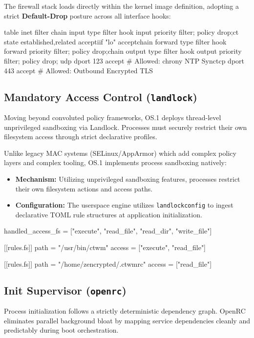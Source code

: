 \documentclass{article}
\let\originalfootnotesize\footnotesize
\let\oldverbatim\verbatim
\let\oldendverbatim\endverbatim
\renewenvironment{verbatim}{\originalfootnotesize\oldverbatim}{\oldendverbatim}
\begin{document}
The firewall stack loads directly within the kernel image definition, adopting a strict \textbf{Default-Drop} posture across all interface hooks:

\begin{verbatim}
[frame=single, label=nftables Core Configurations, breaklines=true, fontsize=\small]
table inet filter {chain input {type filter hook input priority filter;
policy drop;ct state established,related acceptiif "lo" accept}chain forward {type filter hook forward
priority filter; policy drop;}chain output {type filter hook output priority filter; policy drop;
udp dport 123 accept # Allowed: chrony NTP Synctcp dport 443 accept # Allowed: Outbound Encrypted TLS}}
\end{verbatim}

\newpage
\subsection{Mandatory Access Control (\texttt{landlock})}
Moving beyond convoluted policy frameworks, OS.1 deploys thread-level unprivileged sandboxing via Landlock. Processes must securely restrict their own filesystem access through strict declarative profiles.

Unlike legacy MAC systems (SELinux/AppArmor) which add complex policy layers and complex tooling, OS.1 implements process sandboxing natively:
\begin{itemize}
    \item \textbf{Mechanism:} Utilizing unprivileged sandboxing features, processes restrict their own filesystem actions and access paths.
    \item \textbf{Configuration:} The userspace engine utilizes \texttt{landlockconfig} to ingest declarative TOML rule structures at application initialization.
\end{itemize}

\begin{verbatim}
[frame=single, label=Example System Profile: /etc/landlock/ctwm.toml, breaklines=true, fontsize=\small]
[sandbox]
handled_access_fs = ["execute", "read_file", "read_dir", "write_file"]

[[rules.fs]]
path = "/usr/bin/ctwm"
access = ["execute", "read_file"]

[[rules.fs]]
path = "/home/zencrypted/.ctwmrc"
access = ["read_file"]
\end{verbatim}

\subsection{Init Supervisor (\texttt{openrc})}
Process initialization follows a strictly deterministic dependency graph. OpenRC eliminates parallel background bloat by mapping service dependencies cleanly and predictably during boot orchestration.
\end{document}
